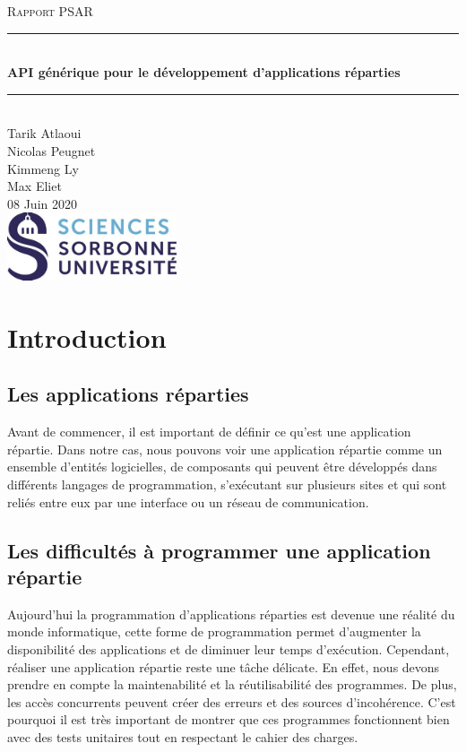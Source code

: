 \documentclass{article}
\date{\today}
\author{Tarik Atlaoui \\ Nicolas Peugnet \\ Kimmeng Ly \\ Max Eliet}
\begin{document}
\begin{titlepage}
	\enlargethispage{2cm}
	\newcommand{\HRule}{\rule{\linewidth}{0.5mm}}
	\center
	\textsc{\LARGE
	Rapport PSAR 
	} \\[1cm]
	\HRule \\[0.4cm]
	{ \huge \bfseries API générique pour le développement d'applications réparties \\[0.15cm] }
	\HRule \\[4cm]
	\large{Tarik Atlaoui \\[3mm] Nicolas Peugnet \\[3mm] Kimmeng Ly \\[3mm] Max Eliet} \\[3cm]
	08 Juin 2020 \\[3cm]
	\hfill \includegraphics[width=5cm]{logoSU.jpg}
\end{titlepage}

	\newpage
	\tableofcontents
	\newpage
		\section{Introduction}
			\subsection{Les applications réparties}
			\large{ Avant de commencer, il est important de définir ce qu’est une application répartie. Dans notre cas, nous pouvons voir une application répartie comme un ensemble d’entités logicielles, de composants qui peuvent être développés dans différents langages de programmation, s’exécutant sur plusieurs sites et qui sont reliés entre eux par une interface ou un réseau de communication.}
			\subsection{Les difficultés à programmer une application répartie}
			\large { Aujourd’hui la programmation d’applications réparties est devenue une réalité du monde informatique, cette forme de programmation permet d'augmenter la disponibilité des applications et de diminuer leur temps d'exécution. Cependant, réaliser une application répartie reste une tâche délicate. En effet, nous devons prendre en compte la maintenabilité et la réutilisabilité des programmes. De plus, les accès concurrents peuvent créer des erreurs et des sources d'incohérence. C’est pourquoi il est très important de montrer que ces programmes fonctionnent bien avec des tests unitaires tout en respectant le cahier des charges.}
\end{document}
